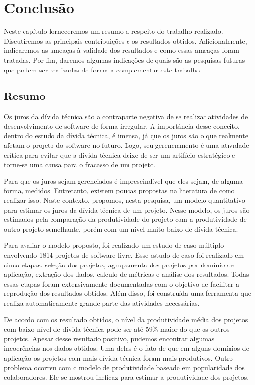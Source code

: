 \chapter{Conclusão}

Neste capítulo forneceremos um resumo a respeito do trabalho realizado. Discutiremos as principais contribuições e os resultados obtidos. Adicionalmente, indicaremos as ameaças à validade dos resultados e como essas ameaças foram tratadas. Por fim, daremos algumas indicações de quais são as pesquisas futuras que podem ser realizadas de forma a complementar este trabalho. 

\section{Resumo}

Os juros da dívida técnica são a contraparte negativa de se realizar atividades de desenvolvimento de software de forma irregular. A importância desse conceito, dentro do estudo da dívida técnica, é imensa, já que os juros são o que realmente afetam o projeto do software no futuro. Logo, seu gerenciamento é uma atividade crítica para evitar que a dívida técnica deixe de ser um artifício estratégico e torne-se uma causa para o fracasso de um projeto. 

Para que os juros sejam gerenciados é imprescindível que eles sejam, de alguma forma, medidos. Entretanto, existem poucas propostas na literatura de como realizar isso. Neste contexto, propomos, nesta pesquisa, um modelo quantitativo para estimar os juros da dívida técnica de um projeto.  Nesse modelo, os juros são estimados pela comparação da produtividade do projeto com a produtividade de outro projeto semelhante, porém com um nível muito baixo de dívida técnica. 

Para avaliar o modelo proposto, foi realizado um estudo de caso múltiplo envolvendo 1814 projetos de software livre. Esse estudo de caso foi realizado em cinco etapas: seleção dos projetos, agrupamento dos projetos por domínio de aplicação, extração dos dados, cálculo de métricas e análise dos resultados. Todas essas etapas foram extensivamente documentadas com o objetivo de facilitar a reprodução dos resultados obtidos. Além disso, foi construída uma ferramenta que realiza automaticamente grande parte das atividades necessárias.

De acordo com os resultado obtidos, o nível da produtividade média dos projetos com baixo nível de dívida técnica pode ser até 59\% maior do que os outros projetos. Apesar desse resultado positivo, pudemos encontrar algumas incoerências nos dados obtidos. Uma delas é o fato de que em alguns domínios de aplicação os projetos com mais dívida técnica foram mais produtivos. Outro problema ocorreu com o modelo de produtividade baseado em popularidade dos colaboradores. Ele se mostrou ineficaz para estimar a produtividade dos projetos.




